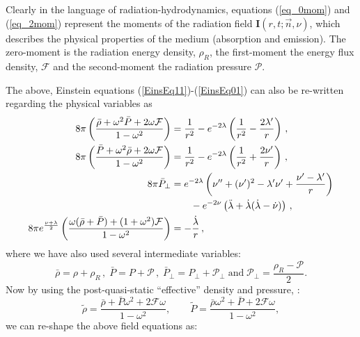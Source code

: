 \documentclass[notitlepage,letterpaper, 10pt]{article}
\begin{document}
Clearly in the language of radiation-hydrodynamics, equations (\ref{eq_0mom}) and (\ref{eq_2mom}) represent the moments of the radiation field $\mathbf{I}(r,t;\vec{n},\nu)$, which describes the physical properties of the medium (absorption and emission). The zero-moment is the radiation energy density, $\rho_{R}$, the first-moment the energy flux density, $\mathcal{F}$ and the second-moment the radiation pressure $\mathcal{P}$.    

The above, Einstein equations (\ref{EinsEq11})-(\ref{EinsEq01}) can also be re-written regarding the physical variables as
\begin{align}
    8\pi \left( \frac{\bar{\rho}+ \omega^2 \bar{P} +2 \omega {\cal F}}{1-\omega^2} \right) & =  
    \frac{1}{r^2} -e^{-2\lambda}\left(\frac{1}{r^2}-\frac{2\lambda'}{r} \right) \, , \label{EinsEq200} \\
    8\pi \left( \frac{\bar{P}+\omega^2 \bar{\rho} + 2 \omega {\cal F}}{1-\omega^2} \right) & 
    = \frac{1}{r^2} -e^{-2\lambda} \left(\frac{1}{r^2}+\frac{2\nu'}{r}\right)\, , \label{EinsEq211} \\
8\pi \bar{P}_{\perp}& =  e^{-2\lambda} \left(\nu^{\prime \prime}+(\nu^{\prime})^2 -\lambda^{\prime}\nu^{\prime} + \frac{\nu^{\prime} - \lambda^{\prime}}{r}\right) 
\nonumber \\
& \qquad - e^{-2\nu}\left(\ddot{\lambda} +\dot{\lambda}(\dot{\lambda}-\dot{\nu})\right) \, , \label{EinsEq222} \\   
8\pi e^{\frac{\nu+\lambda}{2}}\left(\frac{ \omega(\bar{\rho}+\bar{P})+(1+\omega^2){\cal F}}{1-\omega^2} \right)& = -\frac{\dot{\lambda}}{r}\, , \label{EinsEq201}
\end{align}
where we have also used several intermediate variables:
\begin{equation}
\bar{\rho}=\rho+ \rho_{R} \,, \;
\bar{P}= P+ \mathcal{P} \,, \; 
\bar{P}_{\perp}= P_{\perp}+ \mathcal{P}_{\perp} \; \textrm{and} \;
\mathcal{P}_{\perp}=\frac{\rho_{R}-\mathcal{P}}{2} . 
\end{equation}
Now by using the post-quasi-static ``effective'' density and pressure,  \cite{HerreraEtal2002,NunezRueda2007,NavarroEtal2008}:
 \begin{equation}
\tilde{\rho} =\frac{\bar{\rho} + \bar{P}\omega^{2}+ 2 \mathcal{F}\omega}{1-\omega^{2}},
 \qquad
\tilde{P} = \frac{\bar{\rho} \omega^{2}+\bar{P}+ 2 \mathcal{F}\omega}{1-\omega^{2}} ,
\label{VariableEf2}
 \end{equation}
we can re-shape the above field equations as:
\end{document}
